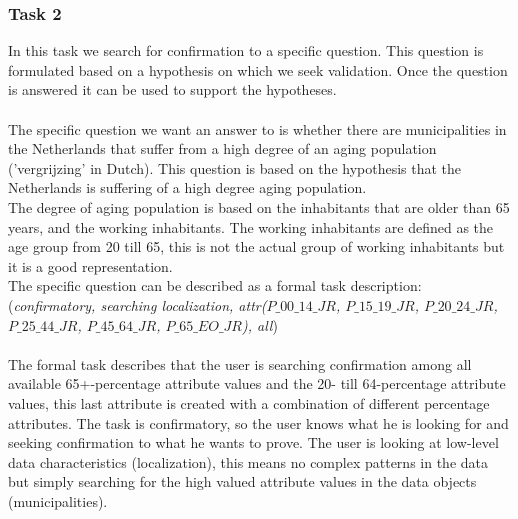 \subsubsection{Task 2}\label{sec:task2}
In this task we search for confirmation to a specific question.
This question is formulated based on a hypothesis on which we seek validation.
Once the question is answered it can be used to support the hypotheses.\\
\\
The specific question we want an answer to is whether there are municipalities in the Netherlands that suffer from a high degree of an aging population ('vergrijzing' in Dutch).
This question is based on the hypothesis that the Netherlands is suffering of a high degree aging population.\\
The degree of aging population is based on the inhabitants that are older than 65 years, and the working inhabitants.
The working inhabitants are defined as the age group from 20 till 65, this is not the actual group of working inhabitants but it is a good representation.
\\
The specific question can be described as a formal task description:\\
(\textit{confirmatory, searching localization, attr($P\_00\_14\_JR$, $P\_15\_19\_JR$, $P\_20\_24\_JR$, $P\_25\_44\_JR$, $P\_45\_64\_JR$, $P\_65\_EO\_JR$), all})\\
\\
The formal task describes that the user is searching confirmation among all available 65+-percentage attribute values and the 20- till 64-percentage attribute values, this last attribute is created with a combination of different percentage attributes.
The task is confirmatory, so the user knows what he is looking for and seeking confirmation to what he wants to prove.
The user is looking at low-level data characteristics (localization), this means no complex patterns in the data but simply searching for the high valued attribute values in the data objects (municipalities). 